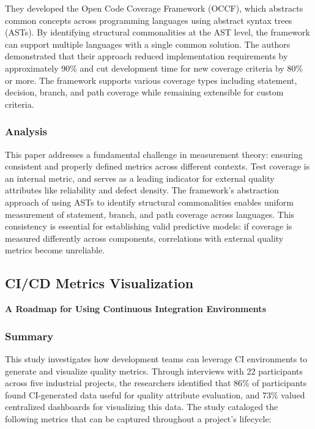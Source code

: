 \documentclass[12pt]{article}
\begin{document}
They developed the Open Code Coverage Framework (OCCF), which
abstracts common concepts across programming languages using abstract
syntax trees (ASTs). By identifying structural commonalities at the
AST level, the framework can support multiple languages with a single common solution. The authors demonstrated
that their approach reduced implementation requirements by
approximately 90\% and cut development time for new coverage criteria
by 80\% or more. The framework supports various coverage types
including statement, decision, branch, and path coverage while remaining
extensible for custom criteria.

\subsubsection{Analysis}
This paper addresses a fundamental challenge in
measurement theory: ensuring consistent and properly defined metrics
across different contexts. Test coverage is an internal metric, and serves as a leading
indicator for external quality attributes like reliability and defect
density. The framework's
abstraction approach of using ASTs to identify structural commonalities
enables uniform measurement of statement, branch, and path coverage
across languages. This consistency is essential for establishing valid
predictive models: if coverage is measured differently across
components, correlations with external quality metrics become
unreliable.

\subsection{CI/CD Metrics Visualization}

\textbf{A Roadmap for Using Continuous Integration Environments} \cite{yu2024roadmap}

\subsubsection{Summary}
This study investigates how development
teams can leverage CI environments to generate and visualize quality
metrics. Through interviews with 22 participants across five
industrial projects, the researchers identified that 86\% of
participants found CI-generated data useful for quality attribute
evaluation, and 73\% valued centralized dashboards for visualizing
this data. The study cataloged the following metrics that can be captured
throughout a project's lifecycle:
\end{document}
